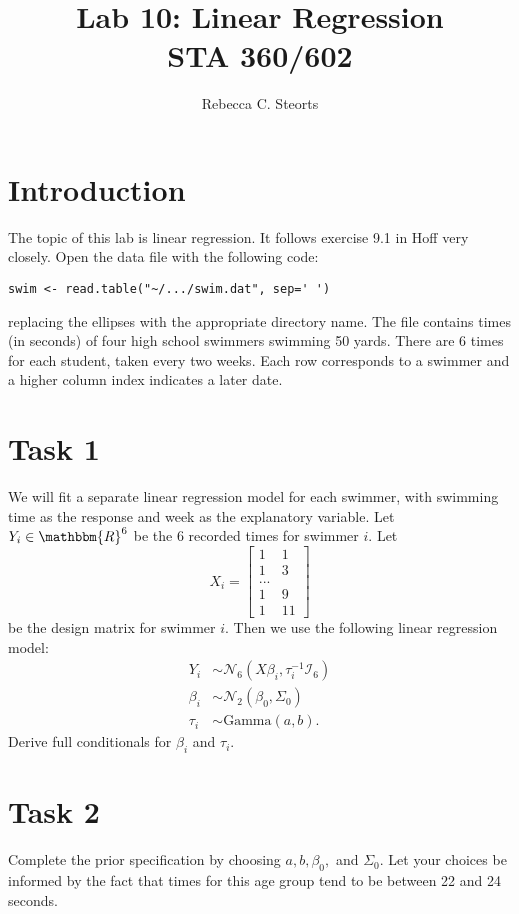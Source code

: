 \documentclass{article}
\title{Lab 10: Linear Regression\\STA 360/602}
\author{Rebecca C. Steorts}
\begin{document}
\maketitle

\section*{Introduction}

The topic of this lab is linear regression. It follows exercise 9.1 in Hoff very closely. Open the data file with the following code: 
\begin{verbatim}
swim <- read.table("~/.../swim.dat", sep=' ')
\end{verbatim}
replacing the ellipses with the appropriate directory name. The file contains times (in seconds) of four high school swimmers swimming 50 yards. There are 6 times for each student, taken every two weeks. Each row corresponds to a swimmer and a higher column index indicates a later date. 

\section*{Task 1} We will fit a separate linear regression model for each swimmer, with swimming time as the response and week as the explanatory variable. Let $Y_{i}\in \mathbbm{R}^{6}$ be the 6 recorded times for swimmer $i.$ Let
\[X_i =
\begin{bmatrix}
    1 & 1  \\
    1 & 3 \\ 
    ... \\
    1 & 9\\
    1 & 11
\end{bmatrix}
\] be the design matrix for swimmer $i.$ Then we use the following linear regression model: 
\begin{align*}
    Y_i &\sim \mathcal{N}_6\left(X\beta_i, \tau_i^{-1}\mathcal{I}_6\right) \\
    \beta_i &\sim \mathcal{N}_2\left(\beta_0, \Sigma_0\right) \\
    \tau_i &\sim \text{Gamma}(a,b).
\end{align*}
Derive full conditionals for $\beta_i$ and $\tau_i.$

\section*{Task 2}

Complete the prior specification by choosing $a,b,\beta_0,$ and $\Sigma_0.$ Let your choices be informed by the fact that times for this age group tend to be between 22 and 24 seconds. 
\end{document}
